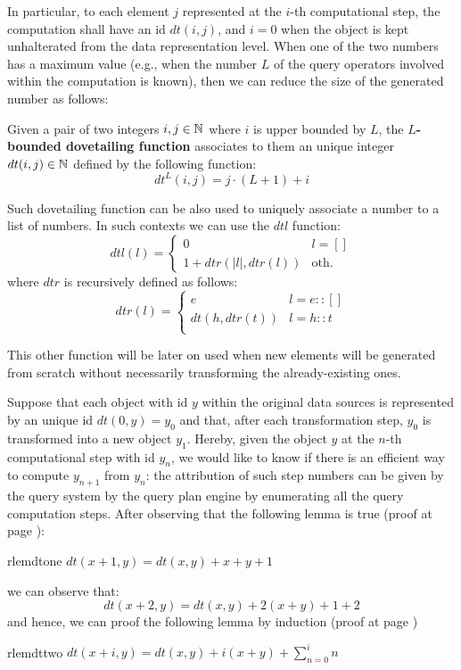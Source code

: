 In particular, to each element $j$ represented at the $i$-th computational step, the computation shall have an id $dt(i,j)$, and $i=0$ when the object is kept unhalterated from the data representation level. When one of the two numbers has a maximum value (e.g., when the number $L$ of the query operators involved within the computation is known), then we can reduce the size of the generated number as follows:

\begin{definition}
	Given a pair of two integers $i,j\in \mathbb{N}$ where $i$ is upper bounded by $L$, the \textbf{$L$-bounded dovetailing function} associates to them an unique integer  $dt(i,j)\in\mathbb{N}$ defined by the following function:
	\[dt^L(i,j)=j\cdot(L+1)+i\]
\end{definition}

Such dovetailing function can be also used to uniquely associate a number to a list of numbers. In such contexts we can use the $dtl$ function: 
\begin{equation}\label{eq:dtl}
dtl(l)=\begin{cases}
0 & l = []\\
1+dtr(|l|,dtr(l)) & \textrm{oth.}
\end{cases}
\end{equation}
where $dtr$ is recursively defined as follows:
\[dtr(l)= \begin{cases}
e & l = e::[]\\
dt(h,dtr(t)) & l = h::t\\
\end{cases}\]

This other function will be later on used when new elements will be generated from scratch without necessarily transforming the already-existing ones.

Suppose that each object with id $y$ within the original data sources is represented by an unique id $dt(0,y)=y_0$ and that, after each transformation step, $y_0$ is transformed into a new object $y_{1}$. Hereby, given the object $y$ at the $n$-th computational step with id $y_n$, we would like to know if there is an efficient way to compute $y_{n+1}$ from $y_{n}$: the attribution of such step numbers can be given by the query system by the query plan engine by enumerating all the query computation steps. After observing that the following lemma is true (proof at page \pageref{proof:dtone}):
\begin{restatable}{rlem}{dtone}
	\label{dtone}
	$dt(x+1,y)=dt(x,y)+x+y+1$
\end{restatable}
we can observe that:
\[dt(x+2,y)=dt(x,y)+2(x+y)+1+2\]
and hence, we can proof the following lemma by induction (proof at page \pageref{proof:dttwo})
\begin{restatable}{rlem}{dttwo}
	\label{dttwo}
	$dt(x+i,y)=dt(x,y)+i(x+y)+\sum_{n=0}^in$
\end{restatable}


